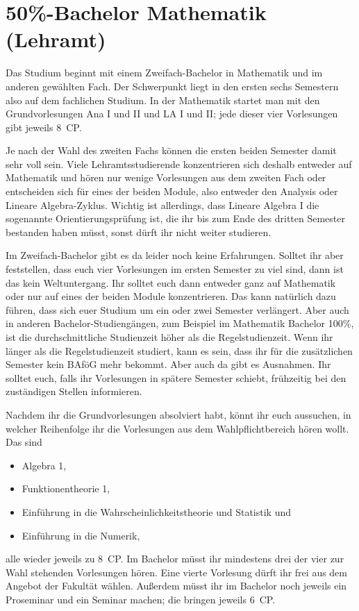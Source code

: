 \section{50\%-Bachelor Mathematik (Lehramt)}

Das Studium beginnt mit einem Zweifach-Bachelor in Mathematik und im anderen gewählten Fach. Der Schwerpunkt liegt in den ersten sechs Semestern also auf dem fachlichen Studium. In der Mathematik startet man mit den Grundvorlesungen Ana I und II und LA I und II; jede dieser vier Vorlesungen gibt jeweils 8~\gls{CP}.

Je nach der Wahl des zweiten Fachs können die ersten beiden Semester damit sehr voll sein. Viele Lehramtsstudierende konzentrieren sich deshalb entweder auf Mathematik und hören nur wenige Vorlesungen aus dem zweiten Fach oder entscheiden sich für eines der beiden Module, also entweder den Analysis oder Lineare Algebra-Zyklus. Wichtig ist allerdings, dass Lineare Algebra I die sogenannte Orientierungsprüfung ist, die ihr bis zum Ende des dritten Semester bestanden haben müsst, sonst dürft ihr nicht weiter studieren.

Im Zweifach-Bachelor gibt es da leider noch keine Erfahrungen. Solltet ihr aber feststellen, dass euch vier Vorlesungen im ersten Semester zu viel sind, dann ist das kein Weltuntergang. Ihr solltet euch dann entweder ganz auf Mathematik oder nur auf eines der beiden Module konzentrieren. Das kann natürlich dazu führen, dass sich euer Studium um ein oder zwei Semester verlängert. Aber auch in anderen Bachelor-Studiengängen, zum Beispiel im Mathematik Bachelor 100\%, ist die durchschnittliche Studienzeit höher als die Regelstudienzeit. Wenn ihr länger als die Regelstudienzeit studiert, kann es sein, dass ihr für die zusätzlichen Semester kein BAföG mehr bekommt. Aber auch da gibt es Ausnahmen. Ihr solltet euch, falls ihr Vorlesungen in spätere Semester schiebt, frühzeitig bei den zuständigen Stellen informieren.

Nachdem ihr die Grundvorlesungen absolviert habt, könnt ihr euch aussuchen, in welcher Reihenfolge ihr die Vorlesungen aus dem Wahlpflichtbereich hören wollt. Das sind
\begin{itemize}
  \item Algebra 1,
  \item Funktionentheorie 1,
  \item Einführung in die Wahrscheinlichkeitstheorie und Statistik und
  \item Einführung in die Numerik,
\end{itemize}
alle wieder jeweils zu 8~\gls{CP}. Im Bachelor müsst ihr mindestens drei der vier zur Wahl stehenden Vorlesungen hören. Eine vierte Vorlesung dürft ihr frei aus dem Angebot der Fakultät wählen. Außerdem müsst ihr im Bachelor noch jeweils ein Proseminar und ein Seminar machen; die bringen jeweils 6~\gls{CP}.

